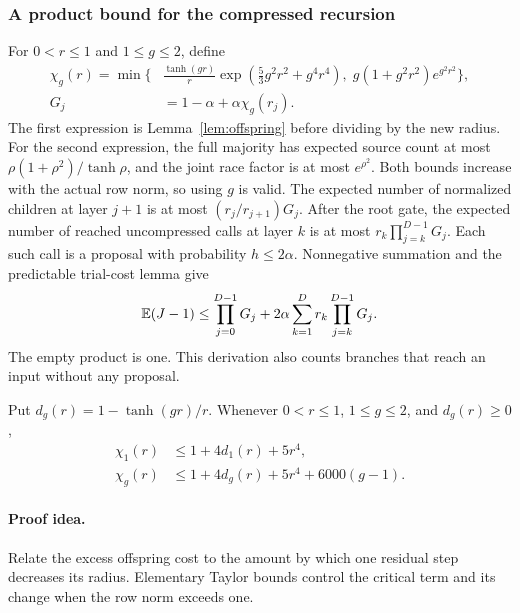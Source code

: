 \subsubsection{A product bound for the compressed recursion}

For $0<r\le1$ and $1\le g\le2$, define
\begin{align*}
\chi_g(r)=\min\biggl\{&
\frac{\tanh(gr)}r
 \exp\!\left(\frac53g^2r^2+g^4r^4\right),\;
g(1+g^2r^2)e^{g^2r^2}\biggr\},\\
G_j&=1-\alpha+\alpha\chi_g(r_j).
\end{align*}
The first expression is Lemma~\ref{lem:offspring} before dividing
by the new radius. For the second expression, the full majority
has expected source count at most
$\rho(1+\rho^2)/\tanh\rho$, and the joint race factor is at most
$e^{\rho^2}$. Both bounds increase with the actual row norm,
so using $g$ is valid.
The expected number of normalized children at layer $j+1$ is at
most $(r_j/r_{j+1})G_j$.
After the root gate, the expected number of reached uncompressed
calls at layer $k$ is at most
$r_k\prod_{j=k}^{D-1}G_j$.
Each such call is a proposal with probability $h\le2\alpha$.
Nonnegative summation and the predictable trial-cost lemma give
\begin{equation}\label{eq:resproduct}
\mathbb E(J-1)\le
\prod_{j=0}^{D-1}G_j
+2\alpha\sum_{k=1}^{D}r_k\prod_{j=k}^{D-1}G_j.
\end{equation}
The empty product is one. This derivation also counts branches
that reach an input without any proposal.

\begin{lemma}
\label{lem:resradial}
Put $d_g(r)=1-\tanh(gr)/r$. Whenever $0<r\le1$,
$1\le g\le2$, and $d_g(r)\ge0$,
\begin{align}
\chi_1(r)&\le1+4d_1(r)+5r^4,\label{eq:reschicritical}\\
\chi_g(r)&\le1+4d_g(r)+5r^4+6000(g-1).
\label{eq:reschisuper}
\end{align}
\end{lemma}
\paragraph{Proof idea.}
Relate the excess offspring cost to the amount by which one residual step
decreases its radius. Elementary Taylor bounds control the critical term and
its change when the row norm exceeds one.

